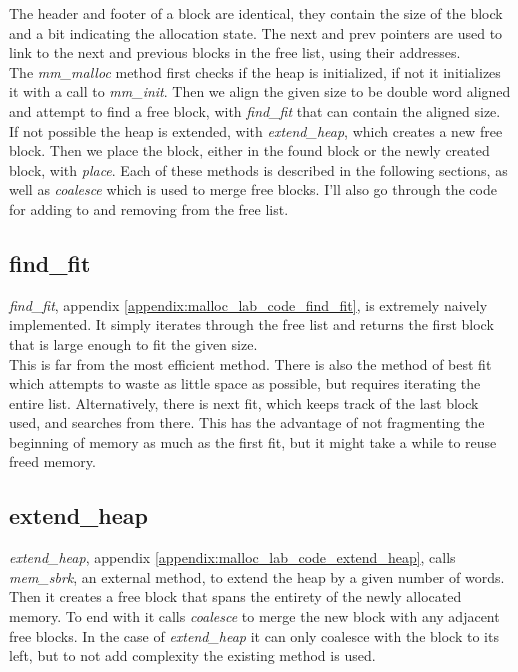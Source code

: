 \documentclass[11pt]{report}
\begin{document}
The header and footer of a block are identical, they contain the size of the block and a bit indicating the allocation state. The next and prev pointers are used to link to the next and previous blocks in the free list, using their addresses.\\[1ex]

The \textit{mm\_malloc} method first checks if the heap is initialized, if not it initializes it with a call to \textit{mm\_init}. Then we align the given size to be double word aligned and attempt to find a free block, with \textit{find\_fit} that can contain the aligned size. If not possible the heap is extended, with \textit{extend\_heap}, which creates a new free block. Then we place the block, either in the found block or the newly created block, with \textit{place}. Each of these methods is described in the following sections, as well as \textit{coalesce} which is used to merge free blocks. I'll also go through the code for adding to and removing from the free list. 

\subsection{find\_fit}
\textit{find\_fit}, appendix \ref{appendix:malloc_lab_code_find_fit}, is extremely naively implemented. It simply iterates through the free list and returns the first block that is large enough to fit the given size.\\[1ex]

This is far from the most efficient method. There is also the method of best fit which attempts to waste as little space as possible, but requires iterating the entire list. Alternatively, there is next fit, which keeps track of the last block used, and searches from there. This has the advantage of not fragmenting the beginning of memory as much as the first fit, but it might take a while to reuse freed memory.

\subsection{extend\_heap}
\textit{extend\_heap}, appendix \ref{appendix:malloc_lab_code_extend_heap}, calls \textit{mem\_sbrk}, an external method, to extend the heap by a given number of words. Then it creates a free block that spans the entirety of the newly allocated memory. To end with it calls \textit{coalesce} to merge the new block with any adjacent free blocks. In the case of \textit{extend\_heap} it can only coalesce with the block to its left, but to not add complexity the existing method is used.\\[1ex]
\end{document}

